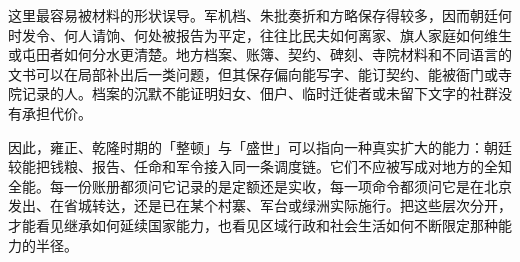 这里最容易被材料的形状误导。军机档、朱批奏折和方略保存得较多，因而朝廷何时发令、何人请饷、何处被报告为平定，往往比民夫如何离家、旗人家庭如何维生或屯田者如何分水更清楚。地方档案、账簿、契约、碑刻、寺院材料和不同语言的文书可以在局部补出后一类问题，但其保存偏向能写字、能订契约、能被衙门或寺院记录的人。档案的沉默不能证明妇女、佃户、临时迁徙者或未留下文字的社群没有承担代价。

因此，雍正、乾隆时期的「整顿」与「盛世」可以指向一种真实扩大的能力：朝廷较能把钱粮、报告、任命和军令接入同一条调度链。它们不应被写成对地方的全知全能。每一份账册都须问它记录的是定额还是实收，每一项命令都须问它是在北京发出、在省城转达，还是已在某个村寨、军台或绿洲实际施行。把这些层次分开，才能看见继承如何延续国家能力，也看见区域行政和社会生活如何不断限定那种能力的半径。
